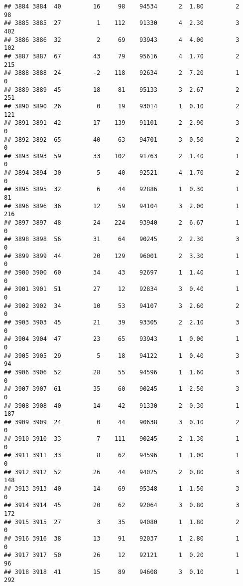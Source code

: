\documentclass[
]{article}
\begin{document}
\begin{verbatim}
## 3884 3884  40         16     98    94534      2  1.80         2       98
## 3885 3885  27          1    112    91330      4  2.30         3      402
## 3886 3886  32          2     69    93943      4  4.00         3      102
## 3887 3887  67         43     79    95616      4  1.70         2      215
## 3888 3888  24         -2    118    92634      2  7.20         1        0
## 3889 3889  45         18     81    95133      3  2.67         2      251
## 3890 3890  26          0     19    93014      1  0.10         2      121
## 3891 3891  42         17    139    91101      2  2.90         3        0
## 3892 3892  65         40     63    94701      3  0.50         2        0
## 3893 3893  59         33    102    91763      2  1.40         1        0
## 3894 3894  30          5     40    92521      4  1.70         2        0
## 3895 3895  32          6     44    92886      1  0.30         1       81
## 3896 3896  36         12     59    94104      3  2.00         1      216
## 3897 3897  48         24    224    93940      2  6.67         1        0
## 3898 3898  56         31     64    90245      2  2.30         3        0
## 3899 3899  44         20    129    96001      2  3.30         1        0
## 3900 3900  60         34     43    92697      1  1.40         1        0
## 3901 3901  51         27     12    92834      3  0.40         1        0
## 3902 3902  34         10     53    94107      3  2.60         2        0
## 3903 3903  45         21     39    93305      2  2.10         3        0
## 3904 3904  47         23     65    93943      1  0.00         1        0
## 3905 3905  29          5     18    94122      1  0.40         3       94
## 3906 3906  52         28     55    94596      1  1.60         3        0
## 3907 3907  61         35     60    90245      1  2.50         3        0
## 3908 3908  40         14     42    91330      2  0.30         1      187
## 3909 3909  24          0     44    90638      3  0.10         2        0
## 3910 3910  33          7    111    90245      2  1.30         1        0
## 3911 3911  33          8     62    94596      1  1.00         1        0
## 3912 3912  52         26     44    94025      2  0.80         3      148
## 3913 3913  40         14     69    95348      1  1.50         3        0
## 3914 3914  45         20     62    92064      3  0.80         3      172
## 3915 3915  27          3     35    94080      1  1.80         2        0
## 3916 3916  38         13     91    92037      1  2.80         1        0
## 3917 3917  50         26     12    92121      1  0.20         1       96
## 3918 3918  41         15     89    94608      3  0.10         1      292

\end{verbatim}
\end{document}
